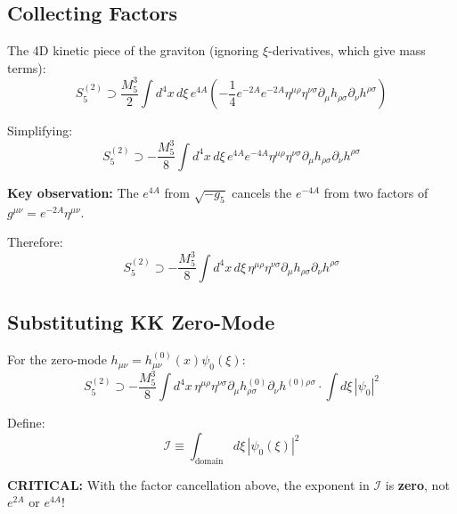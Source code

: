 \documentclass[11pt,a4paper]{article}
\newcommand{\Mfive}{M_5}
\newcommand{\calI}{\mathcal{I}}
\begin{document}
\subsection{Collecting Factors}

The 4D kinetic piece of the graviton (ignoring $\xi$-derivatives, which give
mass terms):
\begin{equation}
S_5^{(2)} \supset \frac{\Mfive^3}{2} \int d^4x\, d\xi\, e^{4A}
\left( -\frac{1}{4} e^{-2A} e^{-2A} \eta^{\mu\rho}\eta^{\nu\sigma}
\partial_\mu h_{\rho\sigma} \partial_\nu h^{\rho\sigma} \right)
\label{eq:factor-step1}
\end{equation}

Simplifying:
\begin{equation}
S_5^{(2)} \supset -\frac{\Mfive^3}{8} \int d^4x\, d\xi\, e^{4A} e^{-4A}
\eta^{\mu\rho}\eta^{\nu\sigma} \partial_\mu h_{\rho\sigma} \partial_\nu h^{\rho\sigma}
\label{eq:factor-step2}
\end{equation}

\textbf{Key observation:} The $e^{4A}$ from $\sqrt{-g_5}$ cancels the $e^{-4A}$
from two factors of $g^{\mu\nu} = e^{-2A}\eta^{\mu\nu}$.

Therefore:
\begin{equation}
S_5^{(2)} \supset -\frac{\Mfive^3}{8} \int d^4x\, d\xi\,
\eta^{\mu\rho}\eta^{\nu\sigma} \partial_\mu h_{\rho\sigma} \partial_\nu h^{\rho\sigma}
\label{eq:factor-step3}
\end{equation}

\subsection{Substituting KK Zero-Mode}

For the zero-mode $h_{\mu\nu} = h_{\mu\nu}^{(0)}(x) \psi_0(\xi)$:
\begin{equation}
S_5^{(2)} \supset -\frac{\Mfive^3}{8} \int d^4x\,
\eta^{\mu\rho}\eta^{\nu\sigma} \partial_\mu h_{\rho\sigma}^{(0)} \partial_\nu h^{(0)\rho\sigma}
\cdot \int d\xi\, |\psi_0|^2
\label{eq:zero-mode-sub}
\end{equation}

Define:
\begin{equation}
\boxed{\calI \equiv \int_{\text{domain}} d\xi\, |\psi_0(\xi)|^2}
\label{eq:I-def}
\end{equation}

\textbf{CRITICAL:} With the factor cancellation above, the exponent in $\calI$
is \textbf{zero}, not $e^{2A}$ or $e^{4A}$!
\end{document}
